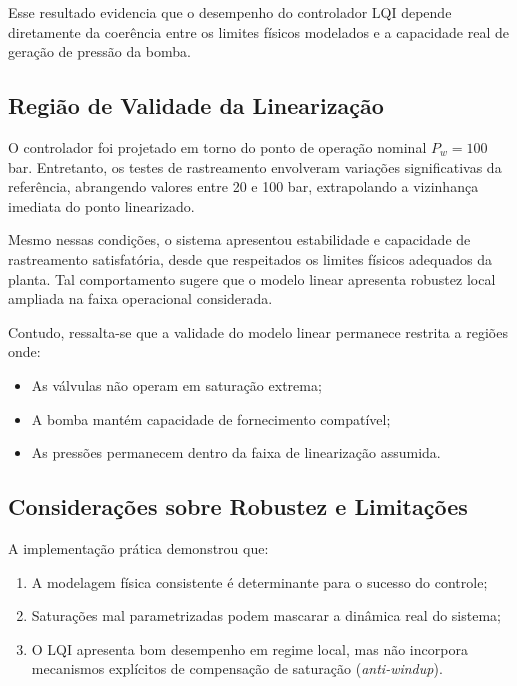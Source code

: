 Esse resultado evidencia que o desempenho do controlador LQI depende diretamente da coerência entre os limites físicos modelados e a capacidade real de geração de pressão da bomba.

\subsection{Região de Validade da Linearização}

O controlador foi projetado em torno do ponto de operação nominal $P_w = 100$ bar. Entretanto, os testes de rastreamento envolveram variações significativas da referência, abrangendo valores entre 20 e 100 bar, extrapolando a vizinhança imediata do ponto linearizado.

Mesmo nessas condições, o sistema apresentou estabilidade e capacidade de rastreamento satisfatória, desde que respeitados os limites físicos adequados da planta. Tal comportamento sugere que o modelo linear apresenta robustez local ampliada na faixa operacional considerada.

Contudo, ressalta-se que a validade do modelo linear permanece restrita a regiões onde:

\begin{itemize}
    \item As válvulas não operam em saturação extrema;
    \item A bomba mantém capacidade de fornecimento compatível;
    \item As pressões permanecem dentro da faixa de linearização assumida.
\end{itemize}

\subsection{Considerações sobre Robustez e Limitações}

A implementação prática demonstrou que:

\begin{enumerate}
    \item A modelagem física consistente é determinante para o sucesso do controle;
    \item Saturações mal parametrizadas podem mascarar a dinâmica real do sistema;
    \item O LQI apresenta bom desempenho em regime local, mas não incorpora mecanismos explícitos de compensação de saturação (\textit{anti-windup}).
\end{enumerate}

